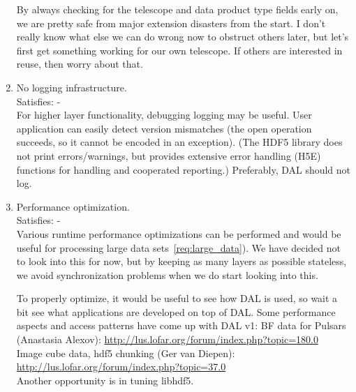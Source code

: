 \documentclass[a4paper,11pt]{article}
\begin{document}
\begin{enumerate}[label=\it D.\arabic{*}]

By always checking for the telescope and data product type fields early on, we are pretty safe from major extension disasters from the start.
I don't really know what else we can do wrong now to obstruct others later, but let's first get something working for our own telescope.
If others are interested in reuse, then worry about that.

\item \label{dsg:logging} No logging infrastructure.\\
Satisfies: -\\
For higher layer functionality, debugging logging may be useful.
User application can easily detect version mismatches (the open operation succeeds, so it cannot be encoded in an exception).
(The HDF5 library does not print errors/warnings, but provides extensive error handling (H5E) functions for handling and cooperated reporting.)
Preferably, DAL should not log.

\item \label{dsg:perf_opt} Performance optimization.\\
Satisfies: -\\

Various runtime performance optimizations can be performed and would be useful for processing large data sets~\ref{req:large_data}).
We have decided not to look into this for now, but by keeping as many layers as possible stateless, we avoid synchronization problems when we do start looking into this.

To properly optimize, it would be useful to see how DAL is used, so wait a bit see what applications are developed on top of DAL.
Some performance aspects and access patterns have come up with DAL v1:
BF data for Pulsars (Anastasia Alexov): \url{http://lus.lofar.org/forum/index.php?topic=180.0}\\
Image cube data, hdf5 chunking (Ger van Diepen): \url{http://lus.lofar.org/forum/index.php?topic=37.0}\\

Another opportunity is in tuning libhdf5.



\end{enumerate}
\end{document}
